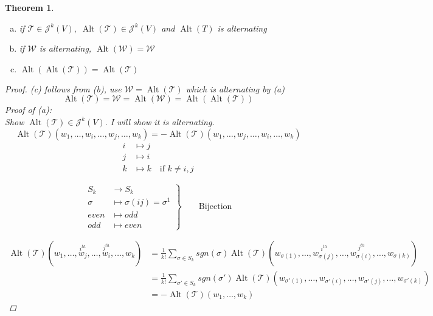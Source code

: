 \documentclass[11pt]{article}
\def\maw{\mathcal{W}}
\def\mat{\mathcal{T}}
\DeclareMathOperator{\alt}{Alt}
\newtheorem{theorem}{Theorem}[section]
\begin{document}
\begin{theorem}\quad\\
\begin{enumerate}[(a)]
\item if $\mat \in \mathcal{J}^k(V), \; \alt(\mat) \in \mathcal{J}^k(V)$ and $\alt(T)$ is alternating
\item if $\mathcal{W}$ is alternating, $\alt(\mathcal{W}) = \mathcal{W}$
\item $\alt(\alt(\mat)) = \alt(\mat)$
\end{enumerate}
\begin{proof}
(c) follows from (b), use $\maw=\alt(\mat)$ which is alternating by (a)
\[\alt(\mat) = \maw = \alt(\maw) = \alt(\alt(\mat))\]
Proof of (a):\\
Show $\alt(\mat) \in \mathcal{J}^k(V).$ I will show it is alternating.
\[\alt(\mat)(w_1, \dots, w_i, \dots , w_j , \dots , w_k) = -\alt(\mat)(w_1, \dots , w_j,\dots, w_i , \dots , w_k)\]
\begin{align*}
i &\mapsto j  \\
j &\mapsto i\\
k &\mapsto k \quad \text{if }k\neq i,j \end{align*}

\begin{equation}
 \left.\begin{aligned}
       S_k &\rightarrow S_k \\
        \sigma &\mapsto \sigma(ij) = \sigma^{1} \\
even &\mapsto odd\\
odd &\mapsto  even 
       \end{aligned}
 \right\}
 \qquad \text{Bijection}
\end{equation}

\begin{align*}
\alt(\mat)(w_1, \dots , \overset{i^{th}}{w_j} , \dots , \overset{j^{th}}{w_i} , \dots , w_k) &= \frac{1}{k!}\sum\limits_{\sigma \in S_k}sgn(\sigma)\alt(\mat)(w_{\sigma(1)}, \dots , \overset{i^{th}}{w_{\sigma(j)}} , \dots , \overset{j^{th}}{w_{\sigma(i)}} , \dots , w_{\sigma(k)}) \\
&=  \frac{1}{k!}\sum\limits_{\sigma' \in S_k}sgn(\sigma')\alt(\mat)(w_{\sigma'(1)}, \dots , w_{\sigma'(i)} , \dots , w_{\sigma'(j)} , \dots , w_{\sigma'(k)})\\
&= -\alt(\mat)(w_1, \dots , w_k) \end{align*}


\end{proof}
\end{theorem}
\end{document}
